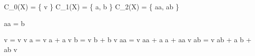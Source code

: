 
C_{0}(X) = \{ v \}
C_{1}(X) = \{ a, b \}
C_{2}(X) = \{ aa, ab \}

\partial aa = b

\Delta v = v \otimes v
\Delta a = v \otimes a + a \otimes v
\Delta b = v \otimes b + b \otimes v
\Delta aa = v \otimes aa + a \otimes a + aa \otimes v
\Delta ab = v \otimes ab + a \otimes b + ab \otimes v

